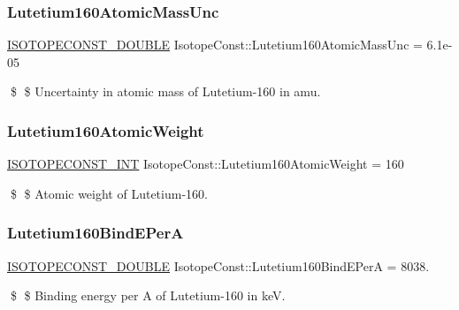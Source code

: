 \subsubsection{\texorpdfstring{Lutetium160\+Atomic\+Mass\+Unc}{Lutetium160AtomicMassUnc}}
{\footnotesize\ttfamily \mbox{\hyperlink{group___isotope_const-_macros_ga8f45a7272ce02c0b4c65c44636ed719a}{I\+S\+O\+T\+O\+P\+E\+C\+O\+N\+S\+T\+\_\+\+D\+O\+U\+B\+LE}} Isotope\+Const\+::\+Lutetium160\+Atomic\+Mass\+Unc = 6.\+1e-\/05}

\$ \$ Uncertainty in atomic mass of Lutetium-\/160 in amu. \mbox{\label{group___isotope_const-_lutetium-_lu160_gaa7d2b8a00cbaeb192b4cdd9d2544e7bf}} 
\subsubsection{\texorpdfstring{Lutetium160\+Atomic\+Weight}{Lutetium160AtomicWeight}}
{\footnotesize\ttfamily \mbox{\hyperlink{group___isotope_const-_macros_ga5f18360b3e99483a35c32d789e62621c}{I\+S\+O\+T\+O\+P\+E\+C\+O\+N\+S\+T\+\_\+\+I\+NT}} Isotope\+Const\+::\+Lutetium160\+Atomic\+Weight = 160}

\$ \$ Atomic weight of Lutetium-\/160. \mbox{\label{group___isotope_const-_lutetium-_lu160_ga71cce444b627ddb83a2eaab56db5a7df}} 
\subsubsection{\texorpdfstring{Lutetium160\+Bind\+E\+PerA}{Lutetium160BindEPerA}}
{\footnotesize\ttfamily \mbox{\hyperlink{group___isotope_const-_macros_ga8f45a7272ce02c0b4c65c44636ed719a}{I\+S\+O\+T\+O\+P\+E\+C\+O\+N\+S\+T\+\_\+\+D\+O\+U\+B\+LE}} Isotope\+Const\+::\+Lutetium160\+Bind\+E\+PerA = 8038.}

\$ \$ Binding energy per A of Lutetium-\/160 in keV. \mbox{\label{group___isotope_const-_lutetium-_lu160_gafd4efd950160b143496bba4b92047c61}} 
